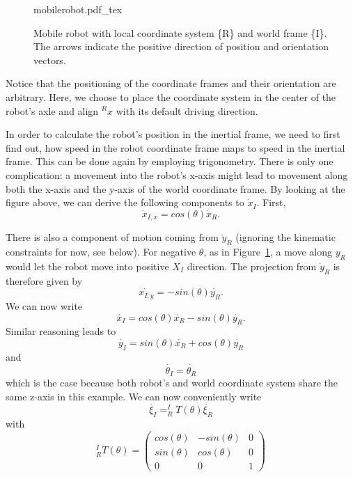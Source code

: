 \begin{figure}[htb!]
    \centering
    \def\svgwidth{0.85\textwidth}
    {mobilerobot.pdf_tex}
    \caption{Mobile robot with local coordinate system \{R\} and world frame \{I\}. The arrows indicate the positive direction of position and orientation vectors.}
    \label{fig:mobilerobot}
\end{figure}



Notice that the positioning of the coordinate frames and their orientation are arbitrary. Here, we choose to place the coordinate system in the center of the robot's axle and align $^Rx$ with its default driving direction.

In order to calculate the robot's position in the inertial frame, we need to first find out, how speed in the robot coordinate frame maps to speed in the inertial frame. This can be done again by employing trigonometry. There is only one complication: a movement into the robot's x-axis might lead to movement along both the x-axis and the y-axis of the world coordinate frame. By looking at the figure above, we can derive the following components to $\dot{x}_I$. First,
\begin{equation}
\dot{x}_{I,x}=cos(\theta) \dot{x}_R.
\end{equation}

There is also a component of motion coming from $ \dot{y}_R$ (ignoring the kinematic constraints for now, see below).  For negative $ \theta$, as in Figure~\ref{fig:mobilerobot}, a move along $y_R$ would let the robot move into positive $ X_I$ direction. The projection from $ \dot{y}_R$ is therefore given by
\begin{equation}
\dot{x_{I,y}}=-sin(\theta)\dot{y_R}.
\end{equation}
We can now write
\begin{equation}
\dot{x_I}=cos(\theta) \dot{x_R} - sin(\theta) \dot{y_R}.
\end{equation}
Similar reasoning leads to
\begin{equation}
\dot{y_I}=sin(\theta) \dot{x_R} + cos(\theta) \dot{y_R}
\end{equation}
and
\begin{equation}
\dot{\theta_I}=\dot{\theta_R}
\end{equation}
which is the case because both robot's and world coordinate system share the same z-axis in this example. We can now conveniently write
\begin{equation}
\dot{\xi_I}=^I_RT(\theta)\dot{\xi_R}
\end{equation}
with
\begin{equation}
^I_RT(\theta)=\left(\begin{array}{ccc}
cos(\theta) & -sin(\theta) & 0 \\
sin(\theta) & cos(\theta) & 0 \\
0 & 0 & 1\end{array}\right)
\end{equation}

